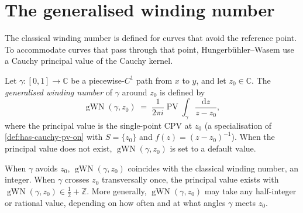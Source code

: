 \section{The generalised winding number}\label{sec:winding}

The classical winding number is defined for curves that avoid the
reference point. To accommodate curves that pass through that point,
Hungerbühler--Wasem use a Cauchy principal value of the Cauchy
kernel.

\begin{definition}
  \label{def:generalized-winding-number}
  \leanok
  Let $\gamma : [0,1] \to \mathbb{C}$ be a piecewise-$C^{1}$ path
  from $x$ to $y$, and let $z_0 \in \mathbb{C}$. The
  \emph{generalised winding number} of $\gamma$ around $z_0$ is
  defined by
  \[
    \operatorname{gWN}(\gamma, z_0)
    \;=\; \frac{1}{2 \pi i}
    \operatorname{PV}\!\!\int_{\gamma}
      \frac{\mathrm{d}z}{z - z_0},
  \]
  where the principal value is the single-point CPV at $z_0$ (a
  specialisation of \cref{def:has-cauchy-pv-on} with
  $S = \{z_0\}$ and $f(z) = (z-z_0)^{-1}$). When the principal value
  does not exist, $\operatorname{gWN}(\gamma, z_0)$ is set to a
  default value.

  When $\gamma$ avoids $z_0$, $\operatorname{gWN}(\gamma, z_0)$
  coincides with the classical winding number, an integer. When
  $\gamma$ crosses $z_0$ transversally once, the principal value
  exists with $\operatorname{gWN}(\gamma, z_0) \in \tfrac{1}{2}
  + \mathbb{Z}$. More generally,
  $\operatorname{gWN}(\gamma, z_0)$ may take any half-integer or
  rational value, depending on how often and at what angles $\gamma$
  meets $z_0$.
\end{definition}
